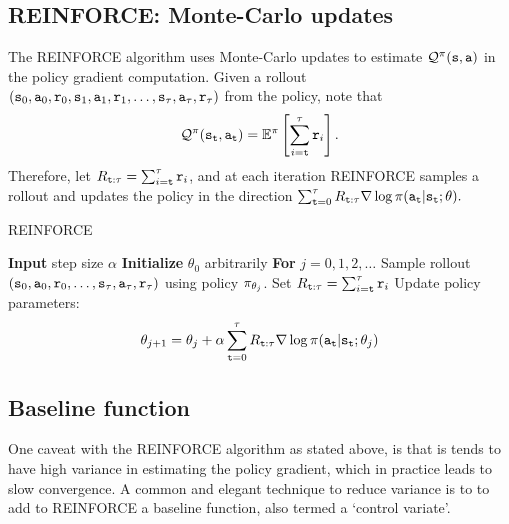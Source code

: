 \subsection{REINFORCE: Monte-Carlo updates}

The REINFORCE algorithm uses Monte-Carlo updates to estimate $\mathcal{Q}^\pi
({\tt s},{\tt a})$ in the policy gradient computation. Given a rollout
$({\tt s}_0,{\tt a}_0,{\tt r}_0,{\tt s}_1,{\tt a}_1,{\tt r}_1, \ldots ,
{\tt s}_\tau,{\tt a}_\tau,{\tt r}_\tau)$ from the policy, note that
\begin{equation*}
    \mathcal{Q}^\pi
({\tt s}_{{\tt t}},{\tt a}_{{\tt t}}) = \mathbb{E}^{\pi}\left[ \sum_{i={\tt t}}^\tau {\tt r}_i \right]. 
\end{equation*}
Therefore, let $R_{{\tt t}:\tau}=\sum_{i={\tt t}}^\tau {\tt r}_i$, and at each iteration REINFORCE samples a rollout and updates the policy in the direction 
$
\sum_{{\tt t}=0}^{\tau} R_{{\tt t}:\tau} \nabla \log
\pi({\tt a}_{\tt t}|{\tt s}_{\tt t};\theta).
$

\begin{algorithm}[H]
\caption{REINFORCE}
\begin{algorithmic}[1]
\State \textbf{Input} step size $\alpha$
\State \textbf{Initialize} $\theta_0$ arbitrarily
\State \textbf{For} $j = 0,1,2,\dots$
\State \quad Sample rollout $({\tt s}_0, {\tt a}_0, {\tt r}_0, \ldots, {\tt s}_\tau, {\tt a}_\tau, {\tt r}_\tau)$ using policy $\pi_{\theta_j}$.
\State \quad Set $R_{{\tt t}:\tau} = \sum_{i={\tt t}}^\tau {\tt r}_i$
\State \quad Update policy parameters:
    \[
    \theta_{j+1} = \theta_j + \alpha \sum_{{\tt t}=0}^{\tau} R_{{\tt t}:\tau} \nabla \log \pi({\tt a}_{\tt t} | {\tt s}_{\tt t}; \theta_j)
    \]
\end{algorithmic}
\end{algorithm}

\subsection*{Baseline function}
One caveat with the REINFORCE algorithm as stated above, is that is tends to have high variance in estimating the policy gradient, which in practice leads to slow convergence. A common and elegant technique to reduce variance is to to add to REINFORCE a baseline function, also termed a `control variate'.

